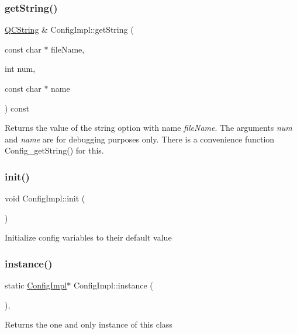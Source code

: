 \subsubsection{\texorpdfstring{getString()}{getString()}}
{\footnotesize\ttfamily \mbox{\hyperlink{class_q_c_string}{Q\+C\+String}} \& Config\+Impl\+::get\+String (\begin{DoxyParamCaption}\item[{const char $\ast$}]{file\+Name,  }\item[{int}]{num,  }\item[{const char $\ast$}]{name }\end{DoxyParamCaption}) const}

Returns the value of the string option with name {\itshape file\+Name}. The arguments {\itshape num} and {\itshape name} are for debugging purposes only. There is a convenience function Config\+\_\+get\+String() for this. \mbox{\label{class_config_impl_a50654e77279eecd43b0dd91cb21420e5}} 
\subsubsection{\texorpdfstring{init()}{init()}}
{\footnotesize\ttfamily void Config\+Impl\+::init (\begin{DoxyParamCaption}{ }\end{DoxyParamCaption})}

Initialize config variables to their default value \mbox{\label{class_config_impl_a1415dd4c0a72ff3b7a36829eecb8944d}} 
\subsubsection{\texorpdfstring{instance()}{instance()}}
{\footnotesize\ttfamily static \mbox{\hyperlink{class_config_impl}{Config\+Impl}}$\ast$ Config\+Impl\+::instance (\begin{DoxyParamCaption}{ }\end{DoxyParamCaption})\hspace{0.3cm}{\ttfamily [inline]}, {\ttfamily [static]}}

Returns the one and only instance of this class \mbox{\label{class_config_impl_a71338cf913b7d77ffc139574d7fcfd96}} 
